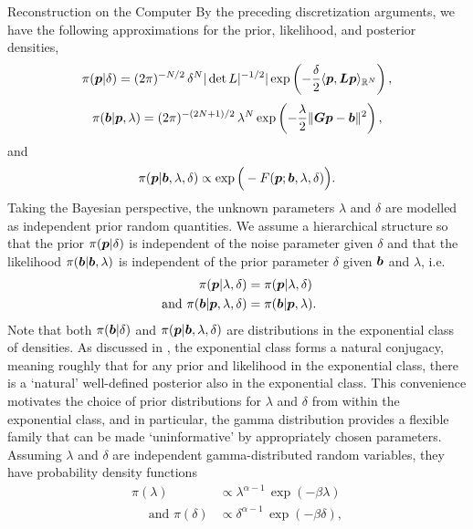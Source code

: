 \begin{chapter}{Reconstruction on the Computer}
By the preceding discretization arguments, we have the following approximations for the prior, likelihood, and posterior densities,
\begin{equation}\label{eq:discretePrior}
  \pi(\mbox{\boldmath$p$}| \delta) =(2\pi)^{-N/2}\,\delta^N |\det L|^{-1/2}|\exp\left(-\frac \delta2 \langle \mbox{\boldmath$p$},\mbox{\boldmath$L$}\mbox{\boldmath$p$}\rangle_{\mathbb R^N}\right),
\end{equation}
\begin{equation} \label{eq:discreteLiklihood}
  \pi(\mbox{\boldmath$b$} |\mbox{\boldmath$p$},\lambda) = (2\pi)^{-(2N+1)/2}\,\lambda^N \exp\left(-\frac \lambda2 \|\mbox{\boldmath$G$}\mbox{\boldmath$p$}-\mbox{\boldmath$b$}\|^2\right),
\end{equation}
and
\begin{equation}\label{eq:discretePosterior}
  \pi(\mbox{\boldmath$p$} | \mbox{\boldmath$b$},\lambda, \delta) \propto \exp\Big(-F(\mbox{\boldmath$p$};\mbox{\boldmath$b$},\lambda,\delta) \Big).
\end{equation}
Taking the Bayesian perspective, the unknown parameters $\lambda$ and $\delta$ are modelled as independent prior random quantities.
We assume a hierarchical structure so that the prior $\pi(\mbox{\boldmath$p$}|\delta)$ is independent of the noise parameter given $\delta$ and that the likelihood $\pi(\mbox{\boldmath$b$}|\mbox{\boldmath$b$},\lambda)$ is independent of the prior parameter $\delta$ given $\mbox{\boldmath$b$}$ and $\lambda$, i.e.
\begin{align}
  \pi(\mbox{\boldmath$p$}|\lambda,\delta) &= \pi(\mbox{\boldmath$p$}|\lambda,\delta) \\
\text{ and } \pi(\mbox{\boldmath$b$}|\mbox{\boldmath$p$},\lambda,\delta) &= \pi(\mbox{\boldmath$b$}|\mbox{\boldmath$p$},\lambda).
\end{align}
Note that both $\pi(\mbox{\boldmath$b$}|\delta)$ and $\pi(\mbox{\boldmath$p$}|\mbox{\boldmath$b$},\lambda,\delta)$ are distributions in the exponential class of densities.
As discussed in \citep{gelman2014bayesian}, the exponential class forms a natural conjugacy, meaning roughly that for any prior and likelihood in the exponential class, there is a `natural' well-defined posterior also in the exponential class.
This convenience motivates the choice of prior distributions for $\lambda$ and $\delta$ from within the exponential class, and in particular, the gamma distribution provides a flexible family that can be made `uninformative' by appropriately chosen parameters.
Assuming $\lambda$ and $\delta$ are independent gamma-distributed random variables, they have probability density functions 
\begin{align} 
                \pi(\lambda) &\propto \lambda^{\alpha -1}\,\exp(-\beta\lambda)\label{eq:deltaPrior}\\
\quad\text{ and }\pi(\delta) &\propto \delta^{\alpha-1}\,\exp(-\beta\delta), \label{eq:lambdaPrior}

\end{align}
\end{chapter}
